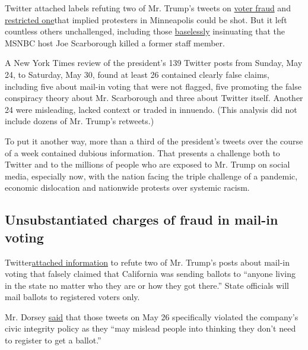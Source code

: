 Twitter attached labels refuting two of Mr. Trump's tweets on
\href{https://www.nytimes3xbfgragh.onion/2020/05/26/technology/twitter-trump-mail-in-ballots.html}{voter
fraud} and
\href{https://www.nytimes3xbfgragh.onion/2020/05/29/technology/trump-twitter-minneapolis-george-floyd.html}{restricted
one}that implied protesters in Minneapolis could be shot. But it left
countless others unchallenged, including those
\href{https://www.nytimes3xbfgragh.onion/2020/05/26/us/politics/klausutis-letter-jack-dorsey.html}{baselessly}
insinuating that the MSNBC host Joe Scarborough killed a former staff
member.

A New York Times review of the president's 139 Twitter posts from
Sunday, May 24, to Saturday, May 30, found at least 26 contained clearly
false claims, including five about mail-in voting that were not flagged,
five promoting the false conspiracy theory about Mr. Scarborough and
three about Twitter itself. Another 24 were misleading, lacked context
or traded in innuendo. (This analysis did not include dozens of Mr.
Trump's retweets.)

To put it another way, more than a third of the president's tweets over
the course of a week contained dubious information. That presents a
challenge both to Twitter and to the millions of people who are exposed
to Mr. Trump on social media, especially now, with the nation facing the
triple challenge of a pandemic, economic dislocation and nationwide
protests over systemic racism.

\hypertarget{unsubstantiated-charges-of-fraud-in-mail-in-voting}{%
\subsection{Unsubstantiated charges of fraud in mail-in
voting}\label{unsubstantiated-charges-of-fraud-in-mail-in-voting}}

Twitter\href{https://www.nytimes3xbfgragh.onion/2020/05/26/technology/twitter-trump-mail-in-ballots.html}{attached
information} to refute two of Mr. Trump's posts about mail-in voting
that falsely claimed that California was sending ballots to ``anyone
living in the state no matter who they are or how they got there.''
State officials will mail ballots to registered voters only.

Mr. Dorsey
\href{https://twitter.com/jack/status/1265837143827468289}{said} that
those tweets on May 26 specifically violated the company's civic
integrity policy as they ``may mislead people into thinking they don't
need to register to get a ballot.''

